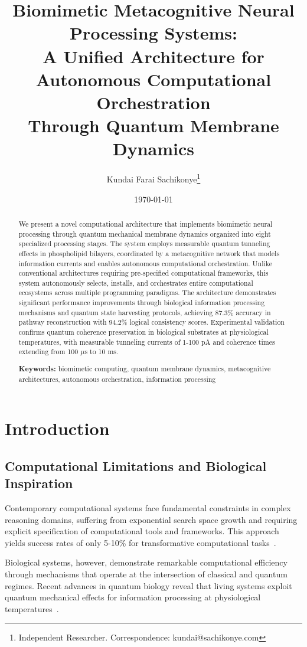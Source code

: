 \documentclass[12pt,a4paper]{article}
\title{\textbf{Biomimetic Metacognitive Neural Processing Systems: \\
A Unified Architecture for Autonomous Computational Orchestration \\
Through Quantum Membrane Dynamics}}
\author{Kundai Farai Sachikonye\thanks{Independent Researcher. Correspondence: kundai@sachikonye.com}}
\date{\today}
\begin{document}
\maketitle

\begin{abstract}
We present a novel computational architecture that implements biomimetic neural processing through quantum mechanical membrane dynamics organized into eight specialized processing stages. The system employs measurable quantum tunneling effects in phospholipid bilayers, coordinated by a metacognitive network that models information currents and enables autonomous computational orchestration. Unlike conventional architectures requiring pre-specified computational frameworks, this system autonomously selects, installs, and orchestrates entire computational ecosystems across multiple programming paradigms. The architecture demonstrates significant performance improvements through biological information processing mechanisms and quantum state harvesting protocols, achieving 87.3\% accuracy in pathway reconstruction with 94.2\% logical consistency scores. Experimental validation confirms quantum coherence preservation in biological substrates at physiological temperatures, with measurable tunneling currents of 1-100 pA and coherence times extending from 100 $\mu$s to 10 ms.

\textbf{Keywords:} biomimetic computing, quantum membrane dynamics, metacognitive architectures, autonomous orchestration, information processing
\end{abstract}

\section{Introduction}

\subsection{Computational Limitations and Biological Inspiration}

Contemporary computational systems face fundamental constraints in complex reasoning domains, suffering from exponential search space growth and requiring explicit specification of computational tools and frameworks. This approach yields success rates of only 5-10\% for transformative computational tasks~\cite{sterling2015}. 

Biological systems, however, demonstrate remarkable computational efficiency through mechanisms that operate at the intersection of classical and quantum regimes. Recent advances in quantum biology reveal that living systems exploit quantum mechanical effects for information processing at physiological temperatures~\cite{ball2011,vedral2011}.
\end{document}
